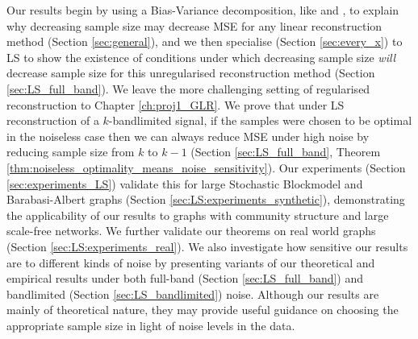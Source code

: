 Our results begin by using a Bias-Variance decomposition, {\color{blue} like \cite{hastie2022surprises} and \cite{nakkiran2019more}}, to explain why decreasing sample size may decrease MSE for any linear reconstruction method (Section \ref{sec:general}), and we then specialise (Section \ref{sec:every_x}) to LS to show the existence of conditions under which decreasing sample size \emph{will} decrease sample size for this unregularised reconstruction method (Section \ref{sec:LS_full_band}). We leave the more challenging setting of regularised reconstruction to Chapter \ref{ch:proj1_GLR}. We prove that under LS reconstruction of a $k$-bandlimited signal, if the samples were chosen to be optimal in the noiseless case then we can always reduce MSE under high noise by reducing sample size from $k$ to $k-1$ {\color{black}(Section \ref{sec:LS_full_band}, Theorem \ref{thm:noiseless_optimality_means_noise_sensitivity})}. Our experiments (Section \ref{sec:experiments_LS}) validate this for large Stochastic Blockmodel and Barabasi-Albert graphs (Section \ref{sec:LS:experiments_synthetic}), demonstrating the applicability of our results to graphs with community structure and large scale-free networks. We further validate our theorems on real world graphs (Section \ref{sec:LS:experiments_real}). We also investigate how sensitive our results are to different kinds of noise by presenting variants of our theoretical and empirical results under both full-band (Section \ref{sec:LS_full_band}) and bandlimited (Section \ref{sec:LS_bandlimited}) noise. Although our results are mainly of theoretical nature, they may provide useful guidance on choosing the appropriate sample size in light of noise levels in the data.

